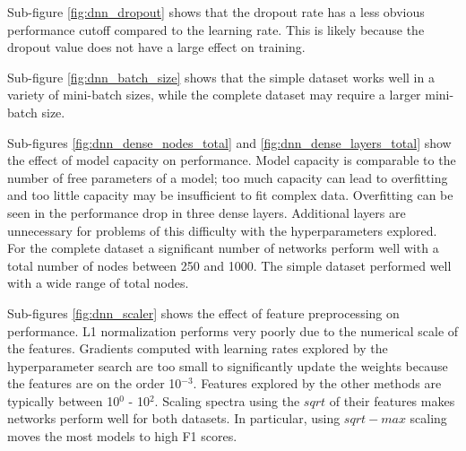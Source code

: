 Sub-figure \ref{fig:dnn_dropout} shows that the dropout rate has a less obvious performance cutoff compared to the learning rate. This is likely because the dropout value does not have a large effect on training.

Sub-figure \ref{fig:dnn_batch_size} shows that the simple dataset works well in a variety of mini-batch sizes, while the complete dataset may require a larger mini-batch size.

Sub-figures \ref{fig:dnn_dense_nodes_total} and \ref{fig:dnn_dense_layers_total} show the effect of model capacity on performance. Model capacity is comparable to the number of free parameters of a model; too much capacity can lead to overfitting and too little capacity may be insufficient to fit complex data. Overfitting can be seen in the performance drop in three dense layers. Additional layers are unnecessary for problems of this difficulty with the hyperparameters explored. For the complete dataset a significant number of networks perform well with a total number of nodes between 250 and 1000. The simple dataset performed well with a wide range of total nodes.

Sub-figures \ref{fig:dnn_scaler} shows the effect of feature preprocessing on performance. L1 normalization performs very poorly due to the numerical scale of the features. Gradients computed with learning rates explored by the hyperparameter search are too small to significantly update the weights because the features are on the order 10$^{-3}$. Features explored by the other methods are typically between 10$^{0}$ - 10$^{2}$. Scaling spectra using the $sqrt$ of their features makes networks perform well for both datasets. In particular, using $sqrt-max$ scaling moves the most models to high F1 scores.

\newcommand{\bluecircle}{\raisebox{2pt}{\tikz{\filldraw[color=blue!60, fill=blue!60, very thick] circle (1.5mm);}}}

